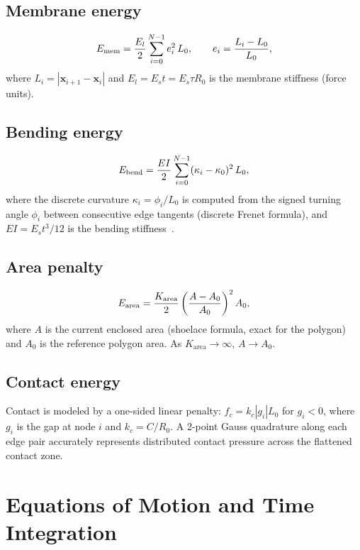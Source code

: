 \documentclass[aps,pre,twocolumn,floatfix,longbibliography]{revtex4-2}
\newcommand{\El}{E_l}
\newcommand{\Karea}{K_{\mathrm{area}}}
\begin{document}
\subsection{Membrane energy}

\begin{equation}
  E_{\rm mem} = \frac{\El}{2} \sum_{i=0}^{N-1} e_i^2\, L_0,
  \qquad e_i = \frac{L_i - L_0}{L_0},
\label{eq:Emem}
\end{equation}
where $L_i = |\mathbf{x}_{i+1} - \mathbf{x}_i|$ and $\El = E_s t = E_s \tau R_0$
is the membrane stiffness (force units).

\subsection{Bending energy}

\begin{equation}
  E_{\rm bend} = \frac{EI}{2}\sum_{i=0}^{N-1} (\kappa_i - \kappa_0)^2\, L_0,
\label{eq:Ebend}
\end{equation}
where the discrete curvature $\kappa_i = \phi_i/L_0$ is computed from the signed
turning angle $\phi_i$ between consecutive edge tangents (discrete Frenet formula),
and $EI = E_s t^3/12$ is the bending stiffness~\cite{Landau1986}.

\subsection{Area penalty}

\begin{equation}
  E_{\rm area} = \frac{\Karea}{2}\left(\frac{A - A_0}{A_0}\right)^2 A_0,
\label{eq:Earea}
\end{equation}
where $A$ is the current enclosed area (shoelace formula, exact for the polygon)
and $A_0$ is the reference polygon area.  As $\Karea \to \infty$, $A \to A_0$.

\subsection{Contact energy}

Contact is modeled by a one-sided linear penalty:
$f_c = k_c |g_i| L_0$ for $g_i < 0$, where $g_i$ is the gap at node $i$ and
$k_c = C/R_0$.  A 2-point Gauss quadrature along each edge pair accurately
represents distributed contact pressure across the flattened contact zone.

\section{Equations of Motion and Time Integration}
\label{sec:eom}
\end{document}
